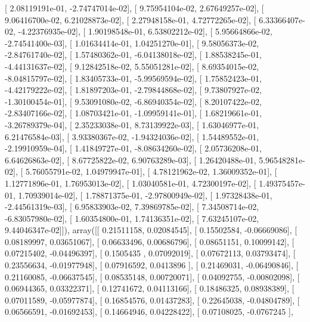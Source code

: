 \documentclass{article}
\begin{document}
       [  2.08119191e-01,  -2.74747014e-02],
       [  9.75954104e-02,   2.67649257e-02],
       [  9.06416700e-02,   6.21028873e-02],
       [  2.27948158e-01,   4.72772265e-02],
       [  6.33366407e-02,  -4.22376935e-02],
       [  1.90198548e-01,   6.53802212e-02],
       [  5.95664866e-02,  -2.74541400e-03],
       [  1.01634414e-01,   1.04251270e-01],
       [  9.58056373e-02,  -2.84761740e-02],
       [  1.57480362e-01,  -6.04138018e-02],
       [  1.88538245e-01,  -4.44131637e-02],
       [  9.12842518e-02,   5.55051281e-02],
       [  8.69354015e-02,  -8.04815797e-02],
       [  1.83405733e-01,  -5.99569594e-02],
       [  1.75852423e-01,  -4.42179222e-02],
       [  1.81897203e-01,  -2.79844868e-02],
       [  9.73807927e-02,  -1.30100454e-01],
       [  9.53091080e-02,  -6.86940354e-02],
       [  8.20107422e-02,  -2.83407166e-02],
       [  1.08703421e-01,  -1.09959141e-01],
       [  1.68219661e-01,  -3.26789379e-04],
       [  2.35233038e-01,   8.73139922e-03],
       [  1.63046977e-01,   6.21476584e-03],
       [  3.93380367e-02,  -1.94324036e-02],
       [  1.54489552e-01,  -2.19910959e-04],
       [  1.41849727e-01,  -8.08634260e-02],
       [  2.05736208e-01,   6.64626863e-02],
       [  8.67725822e-02,   6.90763289e-03],
       [  1.26420488e-01,   5.96548281e-02],
       [  5.76055791e-02,   1.04979947e-01],
       [  4.78121962e-02,   1.36009352e-01],
       [  1.12771896e-01,   1.76953013e-02],
       [  1.03040581e-01,   4.72300197e-02],
       [  1.49375457e-01,   1.70939014e-02],
       [  1.78871375e-01,  -2.97800949e-02],
       [  1.97328438e-01,  -2.44561319e-03],
       [  6.95833903e-02,   7.39869785e-02],
       [  7.34508714e-02,  -6.83057980e-02],
       [  1.60354800e-01,   1.74136351e-02],
       [  7.63245107e-02,   9.44046347e-02]]), array([[ 0.21511158,  0.02084545],
       [ 0.15502584, -0.06669086],
       [ 0.08189997,  0.03651067],
       [ 0.06633496,  0.00686796],
       [ 0.08651151,  0.10099142],
       [ 0.07215402, -0.04496397],
       [ 0.1505435 ,  0.07092019],
       [ 0.07672113,  0.03793474],
       [ 0.23556634, -0.01977948],
       [ 0.07916592,  0.0413896 ],
       [ 0.21469031, -0.06490846],
       [ 0.21160085, -0.06637545],
       [ 0.08535148,  0.00720071],
       [ 0.04092755, -0.00802098],
       [ 0.06944365,  0.03322371],
       [ 0.12741672,  0.04113166],
       [ 0.18486325,  0.08938389],
       [ 0.07011589, -0.05977874],
       [ 0.16854576,  0.01437283],
       [ 0.22645038, -0.04804789],
       [ 0.06566591, -0.01692453],
       [ 0.14664946,  0.04228422],
       [ 0.07108025, -0.0767245 ],
\end{document}
